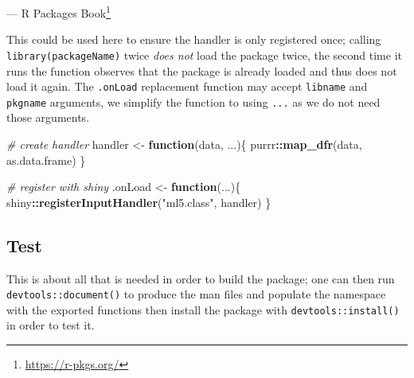 \documentclass[10pt,]{krantz}
\makeatletter
\newenvironment{Shaded}{\begin{snugshade}}{\end{snugshade}}
\newcommand{\CommentTok}[1]{\textcolor[rgb]{0.37,0.37,0.37}{\textit{#1}}}
\newcommand{\ControlFlowTok}[1]{\textcolor[rgb]{0.27,0.27,0.27}{\textbf{#1}}}
\newcommand{\KeywordTok}[1]{\textcolor[rgb]{0.27,0.27,0.27}{\textbf{#1}}}
\newcommand{\NormalTok}[1]{#1}
\newcommand{\OperatorTok}[1]{\textcolor[rgb]{0.43,0.43,0.43}{\textbf{#1}}}
\newcommand{\StringTok}[1]{\textcolor[rgb]{0.5,0.5,0.5}{#1}}
\renewcommand{\href}[2]{#2\footnote{\url{#1}}}
\newenvironment{kframe}{%
\medskip{}
\setlength{\fboxsep}{.8em}
 \def\at@end@of@kframe{}%
 \ifinner\ifhmode%
  \def\at@end@of@kframe{\end{minipage}}%
  \begin{minipage}{\columnwidth}%
 \fi\fi%
 \def\FrameCommand##1{\hskip\@totalleftmargin \hskip-\fboxsep
 \colorbox{shadecolor}{##1}\hskip-\fboxsep
     \hskip-\linewidth \hskip-\@totalleftmargin \hskip\columnwidth}%
 \MakeFramed {\advance\hsize-\width
   \@totalleftmargin\z@ \linewidth\hsize
   \@setminipage}}%
 {\par\unskip\endMakeFramed%
 \at@end@of@kframe}
\renewenvironment{Shaded}{\begin{kframe}}{\end{kframe}}
\makeatother
\begin{document}
--- \href{https://r-pkgs.org/}{R Packages Book}

This could be used here to ensure the handler is only registered once; calling \texttt{library(packageName)} twice \emph{does not} load the package twice, the second time it runs the function observes that the package is already loaded and thus does not load it again. The \texttt{.onLoad} replacement function may accept \texttt{libname} and \texttt{pkgname} arguments, we simplify the function to using \texttt{...} as we do not need those arguments.

\begin{Shaded}
\begin{Highlighting}[]
\CommentTok{# create handler}
\NormalTok{handler <-}\StringTok{ }\ControlFlowTok{function}\NormalTok{(data, ...)\{}
\NormalTok{  purrr}\OperatorTok{::}\KeywordTok{map_dfr}\NormalTok{(data, as.data.frame)}
\NormalTok{\}}

\CommentTok{# register with shiny}
\NormalTok{.onLoad <-}\StringTok{ }\ControlFlowTok{function}\NormalTok{(...)\{}
\NormalTok{  shiny}\OperatorTok{::}\KeywordTok{registerInputHandler}\NormalTok{(}\StringTok{"ml5.class"}\NormalTok{, handler)}
\NormalTok{\}}
\end{Highlighting}
\end{Shaded}

\hypertarget{shiny-complete-pkg-test}{%
\subsection{Test}\label{shiny-complete-pkg-test}}

This is about all that is needed in order to build the package; one can then run \texttt{devtools::document()} to produce the man files and populate the namespace with the exported functions then install the package with \texttt{devtools::install()} in order to test it.
\end{document}
